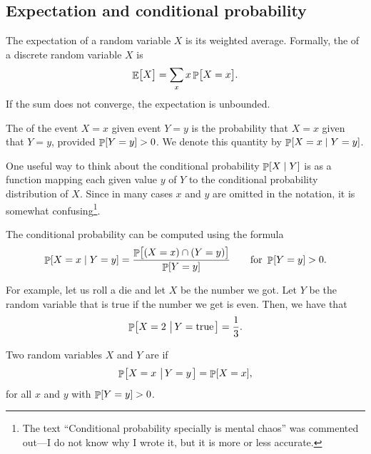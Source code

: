 \subsection{Expectation and conditional probability}

\begin{defn}[Expectation]
    The {expectation} of a random variable $X$ is its weighted
    average. Formally, the  of a discrete random
    variable $X$ is
    \begin{align*}
      \Ex{\bigl. X} = \sum_{x} x \Prob{ \bigl. X = x }.
  \end{align*}
  If the sum does not converge, the expectation is unbounded.
\end{defn}



\begin{defn}%
    The  of the event $X=x$ given event
    $Y=y$ is the probability that $X=x$ given that $Y=y$, provided
    $\Prob{Y=y} > 0$. We denote this quantity by $\mathop{\mathbb{P}}\!\left[ X=x \;\middle\vert\;  Y=y \right]$.
\end{defn}

%
One useful way to think about the conditional probability
$\mathop{\mathbb{P}}\!\left[  X \;\middle\vert\; Y \right]$ is as a function mapping each given value $y$ of $Y$
to the conditional probability distribution of $X$. Since in many cases
$x$ and $y$ are omitted in the notation, it is somewhat
confusing\footnote{The text ``Conditional probability specially is mental
   chaos'' was commented out---I do not know why I wrote it, but it is more
   or less accurate.}.


The conditional probability can be computed using the formula
\begin{align*}
    \ProbCond{X=x}{ Y=y}%
    =%
    \frac{\Prob{\bigl.\pth{ X=x} \cap
          \pth{ Y= y} }}{\Prob{Y=y}}%
    \qquad \text{for } \Prob{Y=y} > 0.
\end{align*}

For example, let us roll a die and let $X$ be the number we got.  Let $Y$
be the random variable that is true if the number we get is even. Then,
we have that
\begin{align*}
    \Prob{X=2 \sep{ Y=\text{\upshape true}} } = \frac{1}{3}.
\end{align*}

\begin{defn}
    Two random variables $X$ and $Y$ are  if
    \begin{equation*}
        \Prob{X = x \sep{Y=y}} = \Prob{X = x},
    \end{equation*}
    for all $x$ and $y$ with $\Prob{Y=y} > 0$.
\end{defn}

